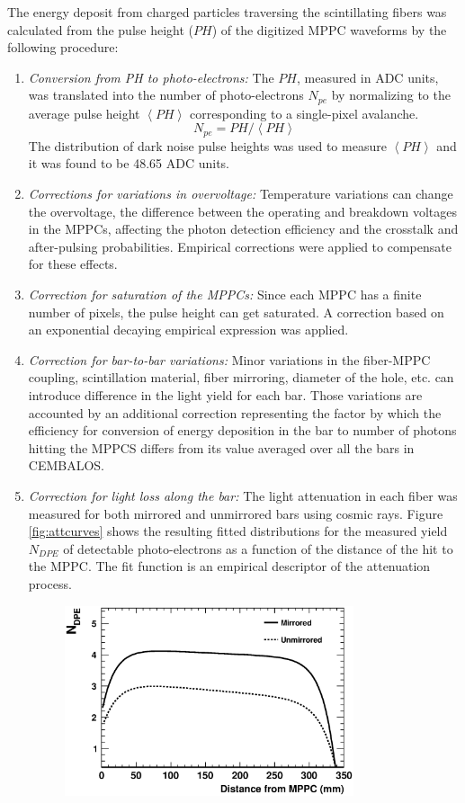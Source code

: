 The energy deposit from charged particles traversing the scintillating fibers was calculated from the pulse height ($PH$) of the digitized MPPC waveforms by the following procedure:

\begin{enumerate}
\item {\it Conversion from PH to photo-electrons:} The $PH$, measured in ADC units, was translated into the number of photo-electrons $N_{pe}$ by normalizing to the average pulse height $\left\langle PH \right\rangle$ corresponding to a single-pixel avalanche. 
\begin{equation}
N_{pe} = PH/\left\langle PH \right\rangle
\end{equation}
The distribution of dark noise pulse heights was used to measure $\left\langle PH \right\rangle$ and it was found to be 48.65 ADC units. 
\item{\it Corrections for variations in overvoltage:} Temperature variations can change the overvoltage, the difference between the operating and breakdown voltages in the MPPCs, affecting the photon detection efficiency and the crosstalk and after-pulsing probabilities. Empirical corrections were applied to compensate for these effects.
\item{\it Correction for saturation of the MPPCs:} Since each MPPC has a finite number of pixels, the pulse height can get saturated. A correction based on an exponential decaying empirical expression was applied.
\item{\it Correction for bar-to-bar variations:} Minor variations in the fiber-MPPC coupling, scintillation material, fiber mirroring, diameter of the hole, etc. can introduce difference in the light yield for each bar. Those variations are accounted by an additional correction representing the factor by which the efficiency for conversion of energy deposition in the bar to number of photons hitting the MPPCS differs from its value averaged over all the bars in CEMBALOS.
\item{\it Correction for light loss along the bar: } The light attenuation in each fiber was measured for both mirrored and unmirrored bars using cosmic rays. Figure \ref{fig:attcurves} shows the resulting fitted distributions for the measured yield $N_{DPE}$ of detectable photo-electrons as a function of the distance of the hit to the MPPC. The fit function is an empirical descriptor of the attenuation process.
\begin{figure}[!h]
\begin{center}
\includegraphics[width=85mm]{figures/attcurves_paper.eps}

\end{center}
\end{figure}
\end{enumerate}
